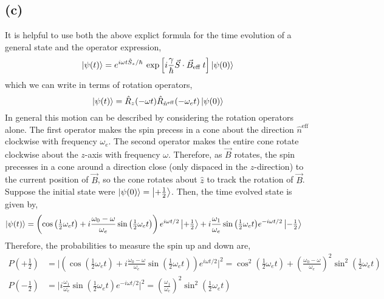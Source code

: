 \documentclass[12pt]{extarticle}
\begin{document}
\subsection*{(c)}

It is helpful to use both the above explict formula for the time evolution of a general state and the operator expression,
\[ \left| \psi(t) \right> = e^{i \omega t \hat{S}_z / \hbar} \: \exp{\left[i \frac{\gamma}{\hbar} \vec{S} \cdot \vec{B}_{\mathrm{eff}} \: t \right]} \left| \psi(0) \right> \]
which we can write in terms of rotation operators, 
\[\left| \psi(t) \right> = \hat{R}_{z}(-\omega t) \hat{R}_{\hat{n}^{\mathrm{eff}}}(-\omega_{e} t) \left| \psi(0) \right>\]
In general this motion can be described by considering the rotation operators alone. The first operator makes the spin precess in a cone about the direction $\hat{n}^{\mathrm{eff}}$ clockwise with frequency $\omega_{e}$. The second operator makes the entire cone rotate clockwise about the $z$-axis with frequency $\omega$. Therefore, as $\vec{B}$ rotates, the spin precesses in a cone around a direction close (only dispaced in the $z$-direction) to the current position of $\vec{B}$, so the cone rotates about $\hat{z}$ to track the rotation of $\vec{B}$.   \bigskip \\
Suppose the initial state were $\left| \psi(0) \right> = \left| + \tfrac{1}{2} \right>$. Then, the time evolved state is given by,
\begin{align*}
\left| \psi(t) \right> & = \left( \cos{\left(\tfrac{1}{2} \omega_{e} t \right)} + i \frac{\omega_0 - \omega}{\omega_{e}} \sin{\left(\tfrac{1}{2} \omega_{e} t \right)} \right) e^{i \omega t /2} \left| + \tfrac{1}{2} \right> +
i \frac{\omega_1}{\omega_{e}} \sin{\left(\tfrac{1}{2} \omega_{e} t \right)} e^{-i \omega t /2} \left| - \tfrac{1}{2} \right>
\end{align*} 
Therefore, the probabilities to measure the spin up and down are,
\begin{align*}
P(+\tfrac{1}{2}) &= \bigg| \left( \cos{\left(\tfrac{1}{2} \omega_{e} t \right)} + i \frac{\omega_0 - \omega}{\omega_{e}} \sin{\left(\tfrac{1}{2} \omega_{e} t \right)} \right) e^{i \omega t /2} \bigg|^2 =  \cos^2{\left(\tfrac{1}{2} \omega_{e} t \right)} + \left(\frac{\omega_0 - \omega}{\omega_{e}} \right)^2 \sin^2{\left(\tfrac{1}{2} \omega_{e} t \right)} \\
P(-\tfrac{1}{2}) &= \bigg| i \frac{\omega_1}{\omega_{e}} \sin{\left(\tfrac{1}{2} \omega_{e} t \right)} e^{-i \omega t /2} \bigg|^2 =  \left(\frac{\omega_1}{\omega_{e}} \right)^2 \sin^2{\left(\tfrac{1}{2} \omega_{e} t \right)} 
\end{align*}
\end{document}
